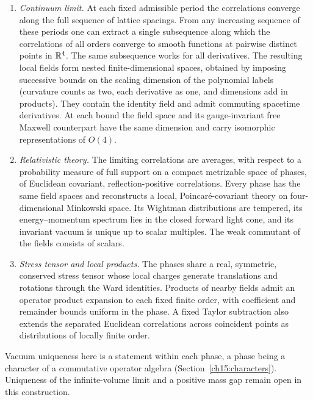 \begin{enumerate}[label=\textup{(\roman*)},leftmargin=*]
\item \textit{Continuum limit.} At each fixed admissible period the
correlations converge along the full sequence of lattice spacings. From
any increasing sequence of these periods one can extract a single
subsequence along which the correlations of all orders converge to smooth
functions at pairwise distinct points in $\mathbb R^4$. The same subsequence
works for all derivatives. The resulting local fields form nested
finite-dimensional spaces, obtained by imposing successive bounds on the
scaling dimension of the polynomial labels (curvature counts as two, each
derivative as one, and dimensions add in products). They contain the identity field and
admit commuting spacetime derivatives. At each bound the field space and
its gauge-invariant free Maxwell counterpart have the same dimension and
carry isomorphic representations of $O(4)$.

\item \textit{Relativistic theory.} The limiting correlations are averages,
with respect to a probability measure of full support on a compact metrizable
space of phases, of Euclidean covariant, reflection-positive correlations.
Every phase has the same field spaces and reconstructs a local,
Poincar\'e-covariant theory on four-dimensional Minkowski space. Its
Wightman distributions are tempered, its energy--momentum spectrum lies
in the closed forward light cone, and its invariant vacuum is unique up
to scalar multiples. The weak commutant of the fields consists of scalars.

\item \textit{Stress tensor and local products.} The phases share a real,
symmetric, conserved stress tensor whose local charges generate translations
and rotations through the Ward identities. Products of nearby fields admit
an operator product expansion to each fixed finite order, with coefficient
and remainder bounds uniform in the phase. A fixed Taylor subtraction
also extends the separated Euclidean correlations across coincident points
as distributions of locally finite order.
\end{enumerate}

Vacuum uniqueness here is a statement within each phase, a phase being a character of a commutative operator algebra (Section~\ref{ch15:characters}). Uniqueness of
the infinite-volume limit and a positive mass gap remain open in this construction.

